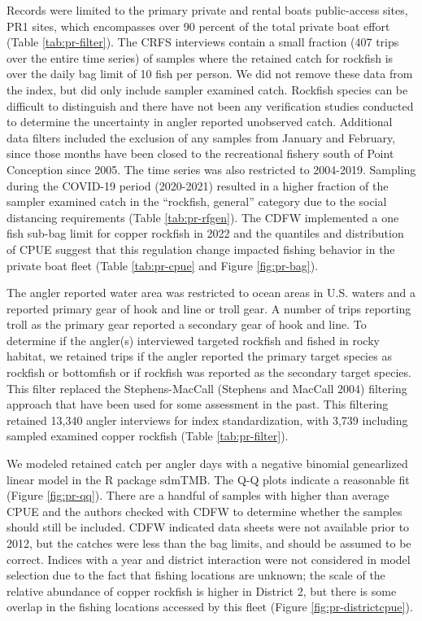 \documentclass[11pt,
  english,
  letterpaper,
]{article}
\begin{document}
Records were limited to the primary private and rental boats public-access sites, PR1 sites, which encompasses over 90 percent of the total private boat effort (Table \ref{tab:pr-filter}). The CRFS interviews contain a small fraction (407 trips over the entire time series) of samples where the retained catch for rockfish is over the daily bag limit of 10 fish per person. We did not remove these data from the index, but did only include sampler examined catch. Rockfish species can be difficult to distinguish and there have not been any verification studies conducted to determine the uncertainty in angler reported unobserved catch. Additional data filters included the exclusion of any samples from January and February, since those months have been closed to the recreational fishery south of Point Conception since 2005. The time series was also restricted to 2004-2019. Sampling during the COVID-19 period (2020-2021) resulted in a higher fraction of the sampler examined catch in the ``rockfish, general'' category due to the social distancing requirements (Table \ref{tab:pr-rfgen}). The CDFW implemented a one fish sub-bag limit for copper rockfish in 2022 and the quantiles and distribution of CPUE suggest that this regulation change impacted fishing behavior in the private boat fleet (Table \ref{tab:pr-cpue} and Figure \ref{fig:pr-bag}).

The angler reported water area was restricted to ocean areas in U.S. waters and a reported primary gear of hook and line or troll gear. A number of trips reporting troll as the primary gear reported a secondary gear of hook and line. To determine if the angler(s) interviewed targeted rockfish and fished in rocky habitat, we retained trips if the angler reported the primary target species as rockfish or bottomfish or if rockfish was reported as the secondary target species. This filter replaced the Stephens-MacCall (Stephens and MacCall 2004) filtering approach that have been used for some assessment in the past. This filtering retained 13,340 angler interviews for index standardization, with 3,739 including sampled examined copper rockfish (Table \ref{tab:pr-filter}).

We modeled retained catch per angler days with a negative binomial genearlized linear model in the R package sdmTMB. The Q-Q plots indicate a reasonable fit (Figure \ref{fig:pr-qq}). There are a handful of samples with higher than average CPUE and the authors checked with CDFW to determine whether the samples should still be included. CDFW indicated data sheets were not available prior to 2012, but the catches were less than the bag limits, and should be assumed to be correct. Indices with a year and district interaction were not considered in model selection due to the fact that fishing locations are unknown; the scale of the relative abundance of copper rockfish is higher in District 2, but there is some overlap in the fishing locations accessed by this fleet (Figure \ref{fig:pr-districtcpue}).
\end{document}
